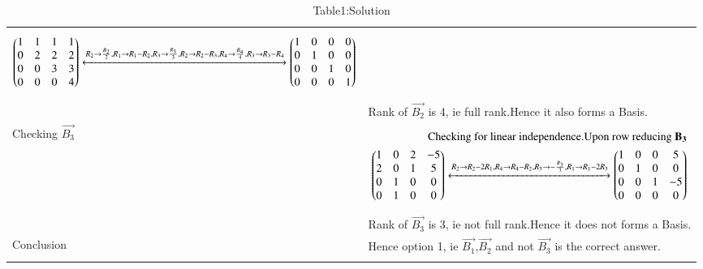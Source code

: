 \documentclass[journal,12pt,onecolumn]{IEEEtran}
\begin{document}
\begin{longtable}{|p{5cm}|p{13cm}|}
{\begin{align}
    \begin{pmatrix}1&1&1&1\\0&2&2&2\\0&0&3&3\\0&0&0&4\end{pmatrix}\xleftrightarrow[]{R_2\rightarrow\frac{R_2}{2}, R_1\rightarrow R_1-R_2,R_3\rightarrow \frac{R_3}{3},R_2\rightarrow R_2-R_3,R_4\rightarrow \frac{R_4}{4},R_3\rightarrow  R_3-R_4}\begin{pmatrix}1&0&0&0\\0&1&0&0\\0&0&1&0\\0&0&0&1\end{pmatrix}
\end{align}}\\
& Rank of $\vec{B_2}$ is 4, ie full rank.Hence it also forms a Basis.\\
\hline
 Checking $\vec{B_3}$&
\parbox{12cm}{\begin{align}\text{Checking for linear independence.}
  \text{Upon row reducing }\mathbf{B_3}\\
    \begin{pmatrix}1&0&2&-5\\2&0&1&5\\0&1&0&0\\0&1&0&0\end{pmatrix}\xleftrightarrow[]{R_2\rightarrow R_2-2R_1, R_4\rightarrow R_4-R_2,R_3\rightarrow -\frac{R_3}{3},R_1\rightarrow R_1-2R_3}\begin{pmatrix}1&0&0&5\\0&1&0&0\\0&0&1&-5\\0&0&0&0\end{pmatrix}
\end{align}}\\
& Rank of $\vec{B_3}$ is 3, ie not full rank.Hence it does not forms a Basis.\\
\hline
 Conclusion&
Hence option 1, ie  $\vec{B_1}$,$\vec{B_2}$ and not  $\vec{B_3}$ is the correct answer.\\
\hline
\caption*{Table1:Solution}
\end{longtable}
\end{document}
